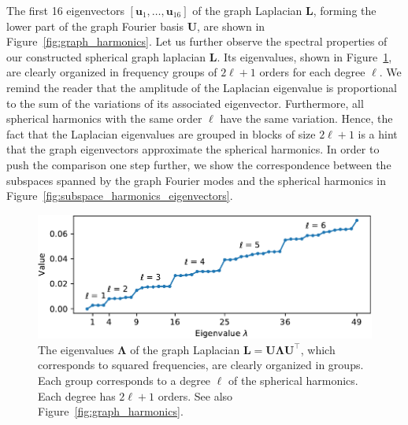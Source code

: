 \documentclass{article} %
\newcommand{\figref}[1]{Figure~\ref{fig:#1}}
\renewcommand{\b}[1]{{\bm{#1}}}   %
\newcommand{\1}{\b{1}}              %
\newcommand{\0}{\b{0}}              %
\renewcommand{\L}{\b{L}}
\newcommand{\U}{\b{U}}
\newcommand{\trans}{^\intercal}
\newcommand{\bLambda}{\b{\Lambda}}
\begin{document}
The first 16 eigenvectors $[\b u_1, \ldots, \b u_{16}]$ of the graph Laplacian $\L$, forming the lower part of the graph Fourier basis $\U$, are shown in \figref{graph_harmonics}.
Let us further observe the spectral properties of our constructed spherical graph laplacian $\L$.
Its eigenvalues, shown in \figref{graph_eigenvalues}, are clearly organized in frequency groups of $2\ell + 1$ orders for each degree $\ell$.
We remind the reader that the amplitude of the Laplacian eigenvalue is proportional to the sum of the variations of its associated eigenvector. Furthermore, all spherical harmonics with the same order $\ell$ have the same variation. Hence, the fact that the Laplacian eigenvalues are grouped in blocks of size $2\ell + 1$ is a hint that the graph eigenvectors approximate the spherical harmonics.
In order to push the comparison one step further, we show the correspondence between the subspaces spanned by the graph Fourier modes and the spherical harmonics in \figref{subspace_harmonics_eigenvectors}.

\begin{figure}[t!]
	\centering
	\includegraphics[width=\linewidth]{graph_eigenvalues}
	\caption{The eigenvalues $\bLambda$ of the graph Laplacian $\L = \U \bLambda \U\trans$, which corresponds to squared frequencies, are clearly organized in groups. Each group corresponds to a degree $\ell$ of the spherical harmonics. Each degree has $2\ell + 1$ orders. 
	See also \figref{graph_harmonics}.
	}
	\label{fig:graph_eigenvalues}
\end{figure}
\end{document}

